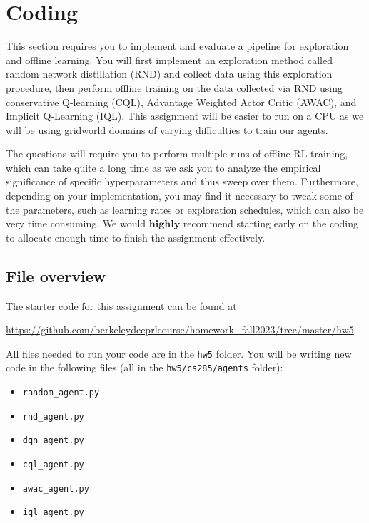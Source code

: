 \documentclass{article}
\begin{document}
\newpage

\section{Coding}
\label{sec:coding}
This section requires you to implement and evaluate a pipeline for exploration and offline learning. You will first implement an exploration method called random network distillation (RND) and collect data using this exploration procedure, then perform offline training on the data collected via RND using conservative Q-learning (CQL), Advantage Weighted Actor Critic (AWAC), and Implicit Q-Learning (IQL). 
This assignment will be easier to run on a CPU as we will be using gridworld domains of varying difficulties to train our agents. 

The questions will require you to perform multiple runs of offline RL training, which can take quite a long time as we ask you to analyze the empirical significance of specific hyperparameters and thus sweep over them. Furthermore, depending on your implementation, you may find it necessary to tweak some of the parameters, such as learning rates or exploration schedules, which can also be very time consuming. We would $\textbf{highly}$ recommend starting early on the coding to allocate enough time to finish the assignment effectively.

\subsection{File overview}
The starter code for this assignment can be found at

\begin{centering}
\url{https://github.com/berkeleydeeprlcourse/homework_fall2023/tree/master/hw5} \\
\end{centering}
\vspace{.35cm}

All files needed to run your code are in the \texttt{hw5} folder. 
You will be writing new code in the following files (all in the \texttt{hw5/cs285/agents} folder):
\begin{itemize}
\item \texttt{random\_agent.py}
\item \texttt{rnd\_agent.py}
\item \texttt{dqn\_agent.py}
\item \texttt{cql\_agent.py}
\item \texttt{awac\_agent.py}
\item \texttt{iql\_agent.py}
\end{itemize}
\end{document}
